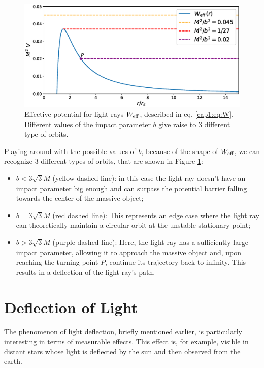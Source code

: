 \begin{figure}[h!]
    \centering
    \includegraphics[width = 0.8 \textwidth]{Figures/W_eff_vs_b.eps}
    \caption{Effective potential for light rays $W_{\rm eff}$, described in eq.
        \ref{cap1:eq:W}.
        Different values of the impact parameter $b$ give raise to 3 different
        type of orbits.}
    \label{ca1:fig:W_eff_orbits}
\end{figure}

Playing around with the possible values of $b$, because of the shape of
$W_{\rm eff}$, we can recognize 3 different types of orbits, that are shown in
Figure \ref{ca1:fig:W_eff_orbits}:

\begin{itemize}
    \item $b < 3 \sqrt{3} M$ (yellow dashed line): in this case the light ray
        doesn't have an impact parameter big enough and can surpass the
        potential barrier falling towards the center of the massive object;
    \item $b = 3 \sqrt{3} M$ (red dashed line): This represents an edge case 
        where the light ray can theoretically maintain a circular orbit at the
        unstable stationary point;
    \item $b > 3 \sqrt{3} M$ (purple dashed line): Here, the light ray has a
        sufficiently large impact parameter, allowing it to approach the massive
        object and, upon reaching the turning point $P$, continue its trajectory
        back to infinity.
        This results in a deflection of the light ray's path.

        
\end{itemize}



\section{Deflection of Light}

The phenomenon of light deflection, briefly mentioned earlier, is particularly
interesting in terms of measurable effects.
This effect is, for example, visible in distant stars whose light is deflected
by the sun and then observed from the earth.

